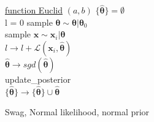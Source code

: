\begin{algorithm}

  \underline{function Euclid} $(a,b)$\;
  \Output{$\{\bm{\hat{\theta}}\}$}
  $\{\bm{\hat{\theta}}\} = \emptyset$\\
  {
    {
      l = 0
      {
        sample $\bm{\theta} \sim \bm{\theta} | \bm{\theta}_0$\\
        sample $\bm{x} \sim \bm{x}_i | \bm{\theta}$\\
        $l \to l + \mathcal{L}(\bm{x}_i, \bm{\hat{\theta}})$\\
      }
      $\bm{\hat{\theta}} \to sgd(\bm{\hat{\theta}})$\\
      update\_posterior\\
      $\{\bm{\hat{\theta}}\} \to \{\bm{\hat{\theta}}\} \cup \bm{\hat{\theta}}$
    }
  }
  \caption{Swag, Normal likelihood, normal prior}
  \label{alg:swag_gaussian}
\end{algorithm}
